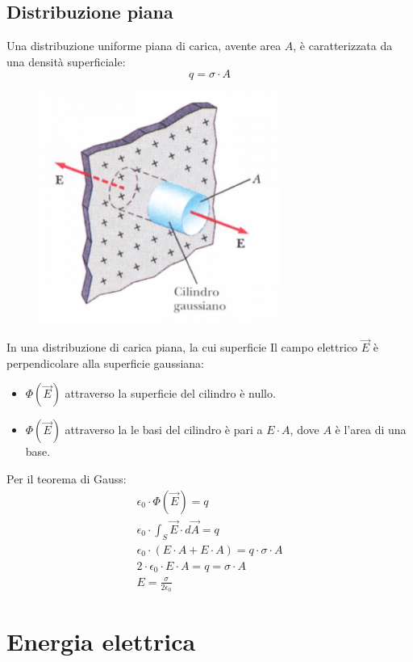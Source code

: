 \subsection{Distribuzione piana}
Una distribuzione uniforme piana di carica, avente area $A$, è caratterizzata da una densità superficiale:
$$q = \sigma \cdot A$$ 
\begin{figure}[h!]
	\centering
	\includegraphics[scale=0.5]{esempio4.png}
\end{figure}
In una distribuzione di carica piana, la cui superficie 
Il campo elettrico $\vec{E}$ è perpendicolare alla superficie gaussiana:
	\begin{itemize}
    	\item{$\Phi(\vec{E})$ attraverso la superficie del cilindro è nullo.}
        \item{$\Phi(\vec{E})$ attraverso la le basi del cilindro è pari a $E \cdot A$, dove $A$ è l'area di una base.}
    \end{itemize}
Per il teorema di Gauss:
	\begin{displaymath}\begin{aligned}
		\epsilon_0 \cdot \Phi(\vec{E}) = q\\
        \epsilon_0 \cdot \int_S \vec{E} \cdot d\vec{A} = q\\
        \epsilon_0 \cdot (E\cdot A + E \cdot A) = q \cdot \sigma \cdot A\\
        2 \cdot \epsilon_0 \cdot E\cdot A = q = \sigma \cdot A\\
        E = \frac{\sigma}{2 \epsilon_0}
	\end{aligned}\end{displaymath}


\section{Energia elettrica}
